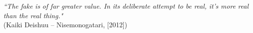 \begin{epigrafe}
    \vspace*{\fill}
{%
    \noindent\hspace{.5\textwidth}
    {\begin{minipage}{.5\textwidth}
        \textit{``The fake is of far greater value. In its deliberate attempt to be real, it’s more real than the real thing."}\\(Kaiki Deishuu {--} Nisemonogatari, [2012])
    \end{minipage}}%
    \vspace*{3cm}
}%
\end{epigrafe}

